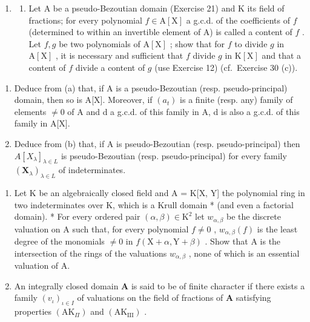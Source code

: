 \begin{enumerate}
\def\labelenumi{\arabic{enumi}.}
\setcounter{enumi}{22}
\tightlist
\item
  \begin{enumerate}
  \def\labelenumii{(\alph{enumii})}
  \tightlist
  \item
    Let A be a pseudo-Bezoutian domain (Exercise 21) and K its field of fractions; for every polynomial \(f \in \mathrm{A}[\mathrm{X}]\) a g.c.d. of the coefficients of \(f\) (determined to within an invertible element of A) is called a content of \(f\) . Let \(f, g\) be two polynomials of \(\mathrm{A}[\mathrm{X}]\) ; show that for \(f\) to divide \(g\) in \(\mathrm{A}[\mathrm{X}]\) , it is necessary and sufficient that \(f\) divide \(g\) in \(\mathrm{K}[\mathrm{X}]\) and that a content of \(f\) divide a content of \(g\) (use Exercise 12) (cf.~Exercise 30 (c)).
  \end{enumerate}
\end{enumerate}

\begin{enumerate}
\def\labelenumi{(\alph{enumi})}
\setcounter{enumi}{1}
\item
  Deduce from (a) that, if A is a pseudo-Bezoutian (resp. pseudo-principal) domain, then so is A{[}X{]}. Moreover, if \((a_{t})\) is a finite (resp. any) family of elements \(\neq0\) of A and d a g.c.d. of this family in A, d is also a g.c.d. of this family in A{[}X{]}.
\item
  Deduce from (b) that, if A is pseudo-Bezoutian (resp. pseudo-principal) then \(A[X_{\lambda}]_{\lambda \in L}\) is pseudo-Bezoutian (resp. pseudo-principal) for every family \((\mathbf{X}_{\lambda})_{\lambda \in L}\) of indeterminates.
\end{enumerate}

\begin{enumerate}
\def\labelenumi{\arabic{enumi}.}
\setcounter{enumi}{23}
\item
  Let K be an algebraically closed field and A = K{[}X, Y{]} the polynomial ring in two indeterminates over K, which is a Krull domain * (and even a factorial domain). * For every ordered pair \((\alpha, \beta) \in \mathrm{K}^{2}\) let \(w_{\alpha,\beta}\) be the discrete valuation on A such that, for every polynomial \(f \neq 0\) , \(w_{\alpha,\beta}(f)\) is the least degree of the monomials \(\neq 0\) in \(f(\mathrm{X} + \alpha, \mathrm{Y} + \beta)\) . Show that A is the intersection of the rings of the valuations \(w_{\alpha,\beta}\) , none of which is an essential valuation of A.
\item
  An integrally closed domain \(\mathbf{A}\) is said to be of finite character if there exists a family \((v_{\iota})_{\iota \in I}\) of valuations on the field of fractions of \(\mathbf{A}\) satisfying properties \((\mathrm{AK}_{\Pi})\) and \((\mathrm{AK}_{\mathrm{III}})\) .
\end{enumerate}

